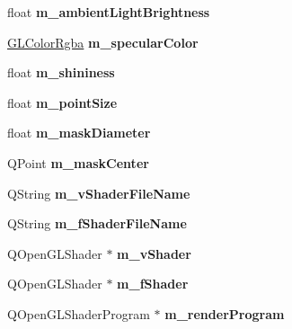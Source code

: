 \begin{DoxyCompactItemize}
\mbox{\label{class_g_l_e_s_renderer_ad40448fd0cbb01b078a759e5f8d9debc}} 
float {\bfseries m\+\_\+ambient\+Light\+Brightness}
\item 
\mbox{\label{class_g_l_e_s_renderer_a58ff6c2e940d9cb7fb8bdf9e676f69cd}} 
\mbox{\hyperlink{class_g_l_color_rgba}{G\+L\+Color\+Rgba}} {\bfseries m\+\_\+specular\+Color}
\item 
\mbox{\label{class_g_l_e_s_renderer_a5cb19e8d00b558a84f3776d51f0aca9c}} 
float {\bfseries m\+\_\+shininess}
\item 
\mbox{\label{class_g_l_e_s_renderer_a8571248c1e8858ccd260d91497e13354}} 
float {\bfseries m\+\_\+point\+Size}
\item 
\mbox{\label{class_g_l_e_s_renderer_a8657f5ff8c5f663cd043731e9753e70a}} 
float {\bfseries m\+\_\+mask\+Diameter}
\item 
\mbox{\label{class_g_l_e_s_renderer_a4251b608f7c887b2bcfcb421b4a793c5}} 
Q\+Point {\bfseries m\+\_\+mask\+Center}
\item 
\mbox{\label{class_g_l_e_s_renderer_a9f9222c1a54ff9b01edb609bb570151a}} 
Q\+String {\bfseries m\+\_\+v\+Shader\+File\+Name}
\item 
\mbox{\label{class_g_l_e_s_renderer_ac876ef67f2795f17e0f1d1e43cb686b4}} 
Q\+String {\bfseries m\+\_\+f\+Shader\+File\+Name}
\item 
\mbox{\label{class_g_l_e_s_renderer_a41916fc04d753007a9340065ab08762e}} 
Q\+Open\+G\+L\+Shader $\ast$ {\bfseries m\+\_\+v\+Shader}
\item 
\mbox{\label{class_g_l_e_s_renderer_a63dd17ddf099e24a26a9d7cdeab664fa}} 
Q\+Open\+G\+L\+Shader $\ast$ {\bfseries m\+\_\+f\+Shader}
\item 
\mbox{\label{class_g_l_e_s_renderer_a49b1f32fad69d86fb7522d1a3f1e8d4f}} 
Q\+Open\+G\+L\+Shader\+Program $\ast$ {\bfseries m\+\_\+render\+Program}

\end{DoxyCompactItemize}
